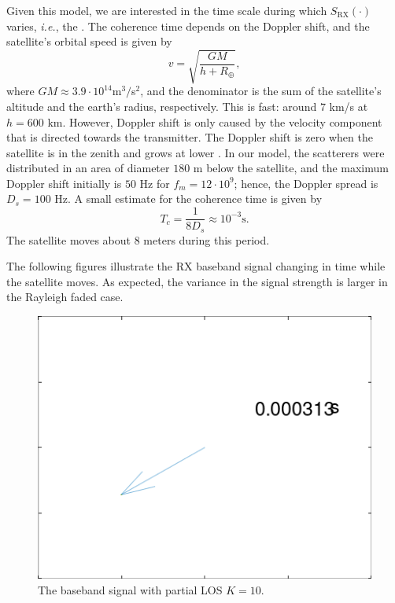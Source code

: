 \documentclass{article}
\begin{document}
Given this model, we are interested in the time scale during which $S_{\text{RX}}(\cdot)$ varies, \textit{i.e.}, the . The coherence time depends on the Doppler shift, and the satellite's orbital speed is given by
\begin{equation}
  v = \sqrt{\frac{GM}{h + R_{\oplus}}}, \tag{3}
\end{equation}
where $GM \approx 3.9 \cdot 10^{14}$m$^3/$s$^2$, and the denominator is the sum of the satellite's altitude and the earth's radius, respectively. This is fast: around $7$ km/s at $h=600$ km. However, Doppler shift is only caused by the velocity component that is directed towards the transmitter. The Doppler shift is zero when the satellite is in the zenith and grows at lower . In our model, the scatterers were distributed in an area of diameter $180$ m below the satellite, and the maximum Doppler shift initially is $50$ Hz for $f_m = 12 \cdot 10^{9}$; hence, the Doppler spread is $D_s = 100$ Hz. A small estimate for the coherence time is given by
\begin{equation}
T_c = \frac{1}{8 D_s} \approx  10^{-3} \text{s}. \tag{4}
\end{equation}
The satellite moves about $8$ meters during this period.

The following figures illustrate the RX baseband signal changing in time while the satellite moves. As expected, the variance in the signal strength is larger in the Rayleigh faded case.

\begin{figure}
  \includegraphics[width=\linewidth]{basebandgifK10.gif}
  \caption{The baseband signal with partial LOS $K=10$.}
\end{figure}
\end{document}
